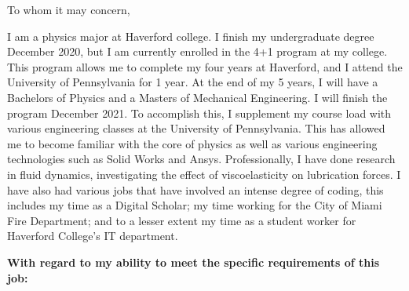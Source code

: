 \par{\Large
To whom it may concern,
}

\par{\large

\quad I am a physics major at Haverford college. I finish my undergraduate degree December 2020, but I am currently enrolled in the 4+1 program at my college. This program allows me to complete my four years at Haverford, and I attend the University of Pennsylvania for 1 year. At the end of my 5 years, I will have a Bachelors of Physics and a Masters of Mechanical Engineering. I will finish the program December 2021. To accomplish this, I supplement my course load with various engineering classes at the University of Pennsylvania. This has allowed me to become familiar with the core of physics as well as various engineering technologies such as Solid Works and Ansys. Professionally, I have done research in fluid dynamics, investigating the effect of viscoelasticity on lubrication forces. I have also had various jobs that have involved an intense degree of coding, this includes my time as a Digital Scholar; my time working for the City of Miami Fire Department; and to a lesser extent my time as a student worker for Haverford College's IT department.

}

\textbf{\Large
With regard to my ability to meet the specific requirements of this job:
}

